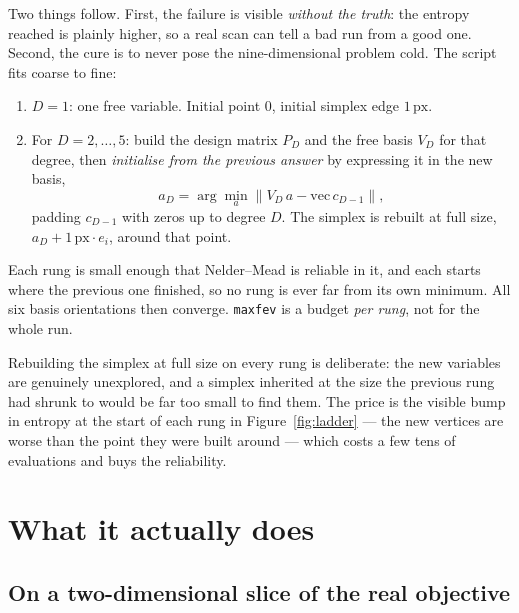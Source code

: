 \documentclass[11pt,a4paper]{article}
\newcommand{\px}{\,\text{px}}
\begin{document}
Two things follow.  First, the failure is visible \emph{without the truth}:
the entropy reached is plainly higher, so a real scan can tell a bad run from
a good one.  Second, the cure is to never pose the nine-dimensional problem
cold.  The script fits coarse to fine:

\begin{enumerate}
\item $D=1$: one free variable.  Initial point $0$, initial simplex edge
  $1\px$.
\item For $D=2,\dots,5$: build the design matrix $P_D$ and the free basis
  $V_D$ for that degree, then \emph{initialise from the previous answer} by
  expressing it in the new basis,
  \begin{equation}
    a_D = \arg\min_a \lVert V_D\,a - \mathrm{vec}\,c_{D-1}\rVert ,
  \end{equation}
  padding $c_{D-1}$ with zeros up to degree $D$.  The simplex is rebuilt at
  full size, $a_D+1\px\cdot e_i$, around that point.
\end{enumerate}

Each rung is small enough that Nelder--Mead is reliable in it, and each starts
where the previous one finished, so no rung is ever far from its own minimum.
All six basis orientations then converge.  \texttt{maxfev} is a budget
\emph{per rung}, not for the whole run.

Rebuilding the simplex at full size on every rung is deliberate: the new
variables are genuinely unexplored, and a simplex inherited at the size the
previous rung had shrunk to would be far too small to find them.  The price is
the visible bump in entropy at the start of each rung in
Figure~\ref{fig:ladder} --- the new vertices are worse than the point they
were built around --- which costs a few tens of evaluations and buys the
reliability.

\section{What it actually does}

\subsection{On a two-dimensional slice of the real objective}
\end{document}
